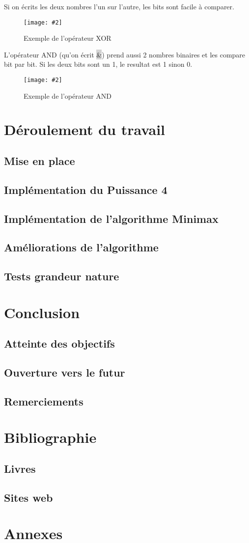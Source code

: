 \documentclass[a4paper]{article}
\newcommand{\img}[3][]{
    \begin{figure}[H]
        \centering
        \texttt{[image: \#2]}
        \caption{#1}    
    \end{figure}
}
\newcommand{\inlinecode}[1]{\colorbox{lightgray}{#1}}
\begin{document}
    Si on écrits les deux nombres l'un sur l'autre, les bits sont facile à comparer.
    \img[Exemple de l'opérateur XOR]{Images/XORExemple.png}{0.2}

    L'opérateur AND (qu'on écrit \inlinecode{\&}) prend aussi 2 nombres binaires et les compare bit par bit. Si les deux bits sont un 1, le resultat est 1 sinon 0.
    \img[Exemple de l'opérateur AND]{Images/ANDExemple.png}{0.2}

    
\section{Déroulement du travail}

\subsection{Mise en place}

\subsection{Implémentation du Puissance 4}

\subsection{Implémentation de l'algorithme Minimax}

\subsection{Améliorations de l'algorithme}

\subsection{Tests grandeur nature}

\section{Conclusion}
\subsection{Atteinte des objectifs}
\subsection{Ouverture vers le futur}
\subsection{Remerciements}

\newpage
\section{Bibliographie}
\subsection{Livres}
\printbibliography[heading=none, type=book]
\subsection{Sites web}
\printbibliography[heading=none, type=misc]

\section{Annexes}
\end{document}

